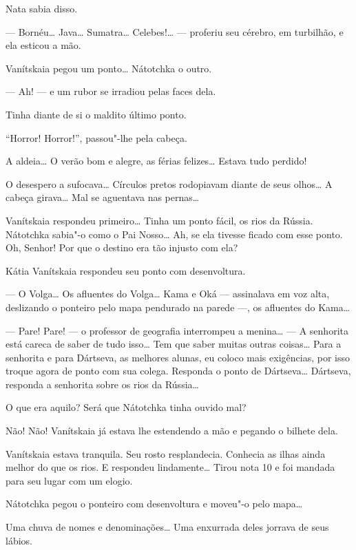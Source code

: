 Nata sabia disso.

--- Bornéu\ldots{} Java\ldots{} Sumatra\ldots{} Celebes!\ldots{} --- proferiu seu cérebro,
em turbilhão, e ela esticou a mão.

Vanítskaia pegou um ponto\ldots{} Nátotchka o outro.

--- Ah! --- e um rubor se irradiou pelas faces dela.

Tinha diante de si o maldito último ponto.

``Horror! Horror!'', passou"-lhe pela cabeça.

A aldeia\ldots{} O verão bom e alegre, as férias felizes\ldots{} Estava tudo
perdido!

O desespero a sufocava\ldots{} Círculos pretos rodopiavam diante de
seus olhos\ldots{} A cabeça girava\ldots{} Mal se aguentava nas pernas\ldots{}

Vanítskaia respondeu primeiro\ldots{} Tinha um ponto fácil, os rios da
Rússia. Nátotchka sabia"-o como o Pai Nosso\ldots{} Ah, se ela tivesse ficado
com esse ponto. Oh, Senhor! Por que o destino era tão injusto com ela?

Kátia Vanítskaia respondeu seu ponto com desenvoltura.

--- O Volga\ldots{} Os afluentes do Volga\ldots{} Kama e Oká --- assinalava em voz
alta, deslizando o ponteiro pelo mapa pendurado na parede ---, os
afluentes do Kama\ldots{}

--- Pare! Pare! --- o professor de geografia interrompeu a menina\ldots{} ---
A senhorita está careca de saber de tudo isso\ldots{} Tem que saber muitas
outras coisas\ldots{} Para a senhorita e para Dártseva, as melhores alunas,
eu coloco mais exigências, por isso troque agora de ponto com sua
colega. Responda o ponto de Dártseva\ldots{} Dártseva, responda a senhorita
sobre os rios da Rússia\ldots{}

O que era aquilo? Será que Nátotchka tinha ouvido mal?

Não! Não! Vanítskaia já estava lhe estendendo a mão e pegando o bilhete
dela.

Vanítskaia estava tranquila. Seu rosto resplandecia. Conhecia as ilhas
ainda melhor do que os rios. E respondeu lindamente\ldots{} Tirou nota 10 e
foi mandada para seu lugar com um elogio.

Nátotchka pegou o ponteiro com desenvoltura e moveu"-o pelo mapa\ldots{}

Uma chuva de nomes e denominações\ldots{} Uma enxurrada deles jorrava de seus
lábios.

